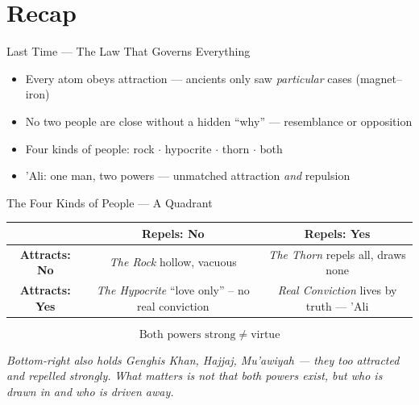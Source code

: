 \section{Recap}

\begin{frame}{Last Time --- The Law That Governs Everything}

\begin{itemize}[itemsep=4pt]
  \item Every atom obeys attraction --- ancients only saw \emph{particular} cases (magnet--iron)
  \item No two people are close without a hidden ``why'' --- resemblance or opposition
  \item Four kinds of people: rock $\cdot$ hypocrite $\cdot$ thorn $\cdot$ both
  \item 'Ali: one man, two powers --- unmatched attraction \emph{and} repulsion
\end{itemize}

\end{frame}


\begin{frame}{The Four Kinds of People --- A Quadrant}

\centering
\scriptsize
\renewcommand{\arraystretch}{1.6}

\begin{tabular}{|c|c|c|}
\hline
& \textbf{Repels: No} & \textbf{Repels: Yes} \\
\hline
\textbf{Attracts: No} &
\emph{The Rock} \newline hollow, vacuous &
\emph{The Thorn} \newline repels all, draws none \\
\hline
\textbf{Attracts: Yes} &
\emph{The Hypocrite} \newline ``love only'' -- no real conviction &
\emph{Real Conviction} \newline lives by truth --- 'Ali \\
\hline
\end{tabular}

\vspace{0.4cm}

\large
\[
\boxed{\text{Both powers strong} \;\ne\; \text{virtue}}
\]

\vspace{0.15cm}

\footnotesize
\textit{Bottom-right also holds Genghis Khan, Hajjaj, Mu'awiyah --- they too attracted and repelled strongly.}
\newline
\textit{What matters is not \emph{that} both powers exist, but \emph{who} is drawn in and \emph{who} is driven away.}

\end{frame}

